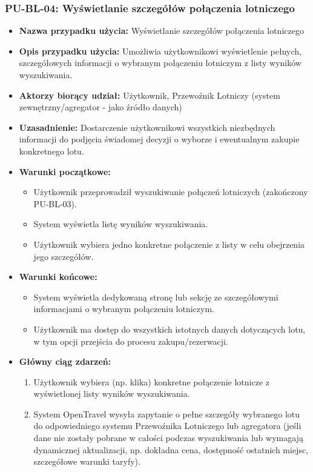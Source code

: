\documentclass[a4paper,12pt]{article}
\begin{document}
\subsubsection{PU-BL-04: Wyświetlanie szczegółów połączenia lotniczego}
\begin{itemize}
    \item \textbf{Nazwa przypadku użycia:} Wyświetlanie szczegółów połączenia lotniczego
    \item \textbf{Opis przypadku użycia:} Umożliwia użytkownikowi wyświetlenie pełnych, szczegółowych informacji o wybranym połączeniu lotniczym z listy wyników wyszukiwania.
    \item \textbf{Aktorzy biorący udział:} Użytkownik, Przewoźnik Lotniczy (system zewnętrzny/agregator - jako źródło danych)
    \item \textbf{Uzasadnienie:} Dostarczenie użytkownikowi wszystkich niezbędnych informacji do podjęcia świadomej decyzji o wyborze i ewentualnym zakupie konkretnego lotu.
    \item \textbf{Warunki początkowe:}
        \begin{itemize}
            \item Użytkownik przeprowadził wyszukiwanie połączeń lotniczych (zakończony PU-BL-03).
            \item System wyświetla listę wyników wyszukiwania.
            \item Użytkownik wybiera jedno konkretne połączenie z listy w celu obejrzenia jego szczegółów.
        \end{itemize}
    \item \textbf{Warunki końcowe:}
        \begin{itemize}
            \item System wyświetla dedykowaną stronę lub sekcję ze szczegółowymi informacjami o wybranym połączeniu lotniczym.
            \item Użytkownik ma dostęp do wszystkich istotnych danych dotyczących lotu, w tym opcji przejścia do procesu zakupu/rezerwacji.
        \end{itemize}
    \item \textbf{Główny ciąg zdarzeń:}
        \begin{enumerate}
            \item Użytkownik wybiera (np. klika) konkretne połączenie lotnicze z wyświetlonej listy wyników wyszukiwania.
            \item System OpenTravel wysyła zapytanie o pełne szczegóły wybranego lotu do odpowiedniego systemu Przewoźnika Lotniczego lub agregatora (jeśli dane nie zostały pobrane w całości podczas wyszukiwania lub wymagają dynamicznej aktualizacji, np. dokładna cena, dostępność ostatnich miejsc, szczegółowe warunki taryfy).

\end{enumerate}
\end{itemize}
\end{document}
